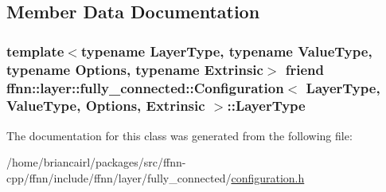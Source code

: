 \subsection{Member Data Documentation}
\hypertarget{classffnn_1_1layer_1_1fully__connected_1_1_configuration_a935cd081500398ecc6c5ed195dbc9402}{
\subsubsection[{Layer\-Type}]{\setlength{\rightskip}{0pt plus 5cm}template$<$typename Layer\-Type, typename Value\-Type, typename Options, typename Extrinsic$>$ friend {\bf ffnn\-::layer\-::fully\-\_\-connected\-::\-Configuration}$<$ Layer\-Type, Value\-Type, Options, Extrinsic $>$\-::Layer\-Type}}\label{classffnn_1_1layer_1_1fully__connected_1_1_configuration_a935cd081500398ecc6c5ed195dbc9402}


The documentation for this class was generated from the following file\-:\begin{DoxyCompactItemize}
\item 
/home/briancairl/packages/src/ffnn-\/cpp/ffnn/include/ffnn/layer/fully\-\_\-connected/\hyperlink{fully__connected_2configuration_8h}{configuration.\-h}\end{DoxyCompactItemize}
